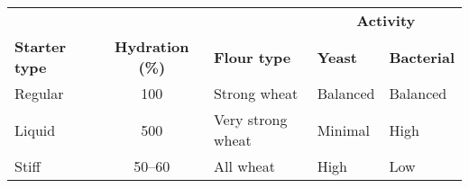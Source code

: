 \begin{tabular}{@{}lclll@{}}
\toprule
                     &                         & &\multicolumn{2}{c}{\textbf{Activity}}\\
                                                                         \cmidrule(ll){4-5}
\textbf{Starter type} & \textbf{Hydration (\%)} & \textbf{Flour type}  & \textbf{Yeast} & \textbf{Bacterial} \\ \midrule
Regular              & 100                     & Strong wheat       & Balanced      & Balanced          \\ 
Liquid               & 500                     & Very strong wheat  & Minimal       & High              \\ 
Stiff                & 50--60                  & All wheat          & High          & Low               \\
\bottomrule
\end{tabular}
